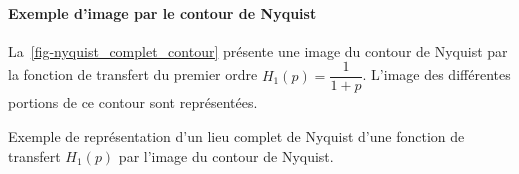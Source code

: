 \paragraph{Exemple d'image par le contour de Nyquist}
La~\cref{fig-nyquist_complet_contour} présente une image du contour
de Nyquist par la fonction de transfert du premier ordre 
$H_1(p)=\dfrac{1}{1+p}$. L'image des différentes portions de ce contour 
sont représentées.
\begin{marginfigure}
    \centering
    
    \caption{Exemple de représentation d'un lieu complet de Nyquist d'une 
             fonction de transfert $H_1(p)$ par l'image du contour de 
             Nyquist. \label{fig-nyquist_complet_image_exemple1}}
\end{marginfigure}
\clearpage
